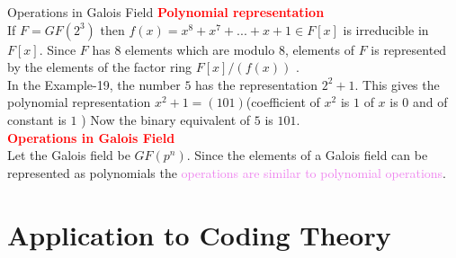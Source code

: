 \documentclass{beamer}
\begin{document}
\begin{frame}{Operations in Galois Field}
\textcolor{red}{\textbf{Polynomial representation}}\\[2mm]
If \(F=GF(2^3)\) then \textcolor{green!50!black}{\(f(x)=x^8+x^7+...+x+1 \in F[x]\)} is irreducible in \(F[x]\). Since \(F\) has \(8\) elements which are modulo \(8\), elements of \(F\) is represented by the elements of the factor ring \(F[x]/(f(x))\) \cite{aes}. \\[5mm]


In the Example-19, the number \textcolor{green!50!black}{\(5\) has the representation \(2^2+1\). This gives the polynomial representation \(x^2+1=(101)\)}(coefficient of \(x^2\) is \(1\) of \(x\) is \(0\) and of constant is \(1\) ) Now the binary equivalent of \(5\) is \(101\).\\[5mm]

\textcolor{red}{\textbf{Operations in Galois Field}}\\[2mm]
Let the Galois field be \(GF(p^n)\). Since the elements of a Galois field can be represented as polynomials the \textcolor{violet}{ operations are similar to polynomial operations}.
\end{frame}

\section{Application to Coding Theory}
\end{document}

